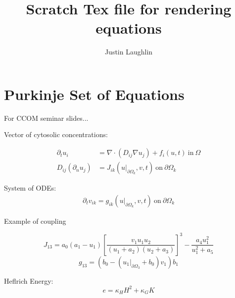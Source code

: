 \documentclass[11pt]{article}
\begin{document}
\title{Scratch Tex file for rendering equations}
%
\author{Justin Laughlin}
\maketitle


\section{Purkinje Set of Equations}
For CCOM seminar slides...

Vector of cytosolic concentrations:

\begin{align*}
\partial_t u_i &= \nabla \cdot (D_{ij} \nabla u_j) + f_i(u,t) ~\text{in}~ \Omega \\
D_{ij} (\partial_n u_j) &= J_{ik}(u|_{\partial\Omega_k},v,t) ~\text{on}~ \partial\Omega_k
\end{align*}

System of ODEs:
\begin{align*}
\partial_t v_{ik} = g_{ik}(u|_{\partial\Omega_k},v,t) ~\text{on}~ \partial\Omega_k
\end{align*}

Example of coupling

\begin{equation}
J_{13} = a_0(a_1-u_1) \left[\frac{v_1 u_1 u_2}{(u_1+a_2)(u_2+a_3)} \right]^3 - \frac{a_4 u_1^2}{u_1^2 + a_5}
\end{equation}
\begin{equation}
g_{13} = (b_0 - (u_1|_{\partial\Omega_3} + b_0)v_1)b_1
\end{equation}



Heflrich Energy:
\begin{equation}
	e = \kappa_H H^2 + \kappa_G K
\end{equation}


\phantom{a}\newpage
%
%



\end{document}
